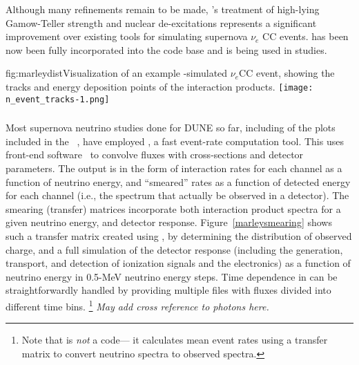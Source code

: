Although many refinements remain to be made, 's treatment of high-lying
Gamow-Teller strength and nuclear de-excitations represents a significant
improvement over existing tools for simulating supernova $\nu_e$ CC events.   has been now been fully incorporated into the  code base 
and is being used in studies.



\begin{dunefigure}{fig:marleydist}{Visualization of an
    example -simulated $\nu_e$CC event, showing the tracks and energy
    deposition points of the interaction products. }
\texttt{[image: n\_event\_tracks-1.png]}
\end{dunefigure}


\subsubsection{ }\label{snowglobes}

Most supernova neutrino studies done for DUNE so far, including of the
plots included in the ~\cite{Acciarri:2015uup}, have employed
 \cite{snowglobes}, a fast event-rate computation tool.  This
uses %
 front-end software~\cite{Huber:2004ka,globes} to
convolve fluxes with cross-sections and detector parameters.  The
output is in the form of interaction rates for each channel as a
function of neutrino energy, and ``smeared'' rates as a function of
detected energy for each channel (i.e., the spectrum that
actually be observed in a detector).  
The smearing (transfer) matrices incorporate both
interaction product spectra for a given neutrino energy, and detector
response.   Figure~\ref{marleysmearing} shows such a transfer matrix
created
using , by determining the distribution of observed charge, and
 a full simulation of the detector response (including the generation,
 transport, and detection of ionization signals and the electronics)
 as a function of neutrino energy in 0.5-MeV neutrino energy steps.
Time dependence in   can be straightforwardly
handled by providing multiple files with fluxes divided into different
time bins. \footnote{Note that   is \textit{not} a 
code--- it calculates mean event rates using a transfer matrix to
convert neutrino spectra to observed spectra.}
\textit{May add cross reference to photons here.}

